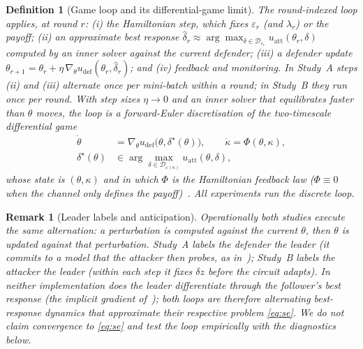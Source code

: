 \documentclass[conference]{IEEEtran}
\newtheorem{definition}{Definition}
\newtheorem{remark}{Remark}
\begin{document}
\begin{definition}[Game loop and its differential-game limit]\label{def:loop}
The round-indexed loop applies, at round $r$: (i) the Hamiltonian step, which fixes $\varepsilon_r$ (and $\lambda_r$) or the payoff; (ii) an approximate best response $\hat\delta_r\approx\arg\max_{\delta\in\mathcal D_{\varepsilon_r}}u_{\mathrm{att}}(\theta_r,\delta)$ computed by an inner solver against the current defender; (iii) a defender update $\theta_{r+1}=\theta_r+\eta\,\nabla_\theta u_{\mathrm{def}}(\theta_r,\hat\delta_r)$; and (iv) feedback and monitoring. In Study~A steps (ii) and (iii) alternate once per mini-batch within a round; in Study~B they run once per round. With step sizes $\eta\to0$ and an inner solver that equilibrates faster than $\theta$ moves, the loop is a forward-Euler discretisation of the two-timescale differential game
\begin{equation}
\begin{aligned}
\dot\theta&=\nabla_\theta u_{\mathrm{def}}\big(\theta,\delta^\star(\theta)\big),\qquad \dot\kappa=\Phi(\theta,\kappa),\\
\delta^\star(\theta)&\in\arg\max_{\delta\in\mathcal D_{\varepsilon(\kappa)}} u_{\mathrm{att}}(\theta,\delta),
\end{aligned}
\label{eq:diffgame}
\end{equation}
whose state is $(\theta,\kappa)$ and in which $\Phi$ is the Hamiltonian feedback law ($\Phi\equiv0$ when the channel only defines the payoff)~\cite{isaacs1965,basar1999}. All experiments run the discrete loop.
\end{definition}

\begin{remark}[Leader labels and anticipation]\label{rem:labels}
Operationally both studies execute the same alternation: a perturbation is computed against the current $\theta$, then $\theta$ is updated against that perturbation. Study~A labels the defender the leader (it commits to a model that the attacker then probes, as in~\cite{bruckner2011}); Study~B labels the attacker the leader (within each step it fixes $\delta z$ before the circuit adapts). In neither implementation does the leader differentiate through the follower's best response (the implicit gradient of~\cite{fiez2020}); both loops are therefore alternating best-response dynamics that approximate their respective problem \eqref{eq:se}. We do not claim convergence to \eqref{eq:se} and test the loop empirically with the diagnostics below.
\end{remark}
\end{document}
